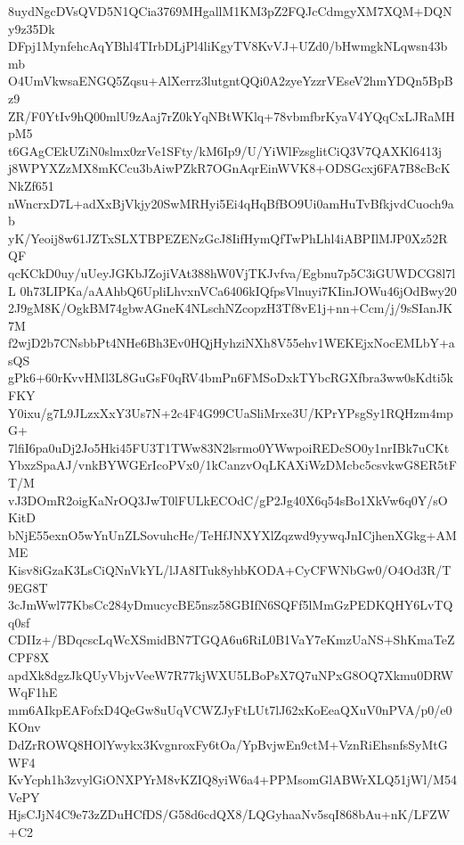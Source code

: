 8uydNgcDVsQVD5N1QCia3769MHgallM1KM3pZ2FQJcCdmgyXM7XQM+DQNy9z35Dk
DFpj1MynfehcAqYBhl4TIrbDLjPl4liKgyTV8KvVJ+UZd0/bHwmgkNLqwsn43bmb
O4UmVkwsaENGQ5Zqsu+AlXerrz3lutgntQQi0A2zyeYzzrVEseV2hmYDQn5BpBz9
ZR/F0YtIv9hQ00mlU9zAaj7rZ0kYqNBtWKlq+78vbmfbrKyaV4YQqCxLJRaMHpM5
t6GAgCEkUZiN0slmx0zrVe1SFty/kM6Ip9/U/YiWlFzsglitCiQ3V7QAXKl6413j
j8WPYXZzMX8mKCcu3bAiwPZkR7OGnAqrEinWVK8+ODSGcxj6FA7B8cBcKNkZf651
nWncrxD7L+adXxBjVkjy20SwMRHyi5Ei4qHqBfBO9Ui0amHuTvBfkjvdCuoch9ab
yK/Yeoij8w61JZTxSLXTBPEZENzGcJ8IifHymQfTwPhLhl4iABPIlMJP0Xz52RQF
qcKCkD0uy/uUeyJGKbJZojiVAt388hW0VjTKJvfva/Egbnu7p5C3iGUWDCG8l7lL
0h73LIPKa/aAAhbQ6UpliLhvxnVCa6406kIQfpsVlnuyi7KIinJOWu46jOdBwy20
2J9gM8K/OgkBM74gbwAGneK4NLschNZcopzH3Tf8vE1j+nn+Ccm/j/9sSIanJK7M
f2wjD2b7CNsbbPt4NHe6Bh3Ev0HQjHyhziNXh8V55ehv1WEKEjxNocEMLbY+asQS
gPk6+60rKvvHMl3L8GuGsF0qRV4bmPn6FMSoDxkTYbcRGXfbra3ww0sKdti5kFKY
Y0ixu/g7L9JLzxXxY3Us7N+2c4F4G99CUaSliMrxe3U/KPrYPsgSy1RQHzm4mpG+
7lfiI6pa0uDj2Jo5Hki45FU3T1TWw83N2lsrmo0YWwpoiREDcSO0y1nrIBk7uCKt
YbxzSpaAJ/vnkBYWGErIcoPVx0/1kCanzvOqLKAXiWzDMcbc5csvkwG8ER5tFT/M
vJ3DOmR2oigKaNrOQ3JwT0lFULkECOdC/gP2Jg40X6q54sBo1XkVw6q0Y/sOKitD
bNjE55exnO5wYnUnZLSovuhcHe/TeHfJNXYXlZqzwd9yywqJnICjhenXGkg+AMME
Kisv8iGzaK3LsCiQNnVkYL/lJA8ITuk8yhbKODA+CyCFWNbGw0/O4Od3R/T9EG8T
3cJmWwl77KbsCc284yDmucycBE5nsz58GBIfN6SQFf5lMmGzPEDKQHY6LvTQq0sf
CDIIz+/BDqcscLqWcXSmidBN7TGQA6u6RiL0B1VaY7eKmzUaNS+ShKmaTeZCPF8X
apdXk8dgzJkQUyVbjvVeeW7R77kjWXU5LBoPsX7Q7uNPxG8OQ7Xkmu0DRWWqF1hE
mm6AIkpEAFofxD4QeGw8uUqVCWZJyFtLUt7lJ62xKoEeaQXuV0nPVA/p0/e0KOnv
DdZrROWQ8HOlYwykx3KvgnroxFy6tOa/YpBvjwEn9ctM+VznRiEhsnfsSyMtGWF4
KvYcph1h3zvylGiONXPYrM8vKZIQ8yiW6a4+PPMsomGlABWrXLQ51jWl/M54VePY
HjsCJjN4C9e73zZDuHCfDS/G58d6cdQX8/LQGyhaaNv5sqI868bAu+nK/LFZW+C2
